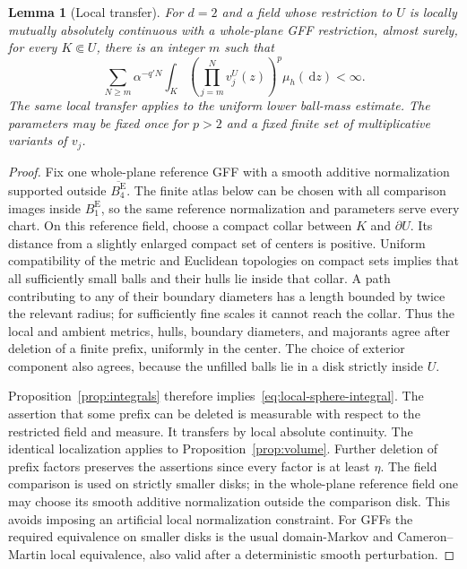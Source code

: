\documentclass[11pt,reqno]{amsart}
\theoremstyle{plain}
\newtheorem{lemma}[theorem]{Lemma}
\theoremstyle{definition}
\theoremstyle{remark}
\newcommand{\1}{\mathbf{1}}
\newcommand{\dd}{\,\mathrm d}
\newcommand{\Be}{B^{\mathrm E}}
\begin{document}
\begin{lemma}[Local transfer]\label{lem:local-transfer}
For $d=2$ and a field whose restriction to $U$ is locally mutually absolutely continuous with a whole-plane GFF restriction, almost surely, for every $K\Subset U$, there is an integer $m$ such that
\begin{equation}\label{eq:local-sphere-integral}
\sum_{N\ge m}\alpha^{-q'N}\int_K\left(\prod_{j=m}^Nv_j^U(z)\right)^p\mu_h(\dd z)<\infty.
\end{equation}
The same local transfer applies to the uniform lower ball-mass estimate. The parameters may be fixed once for $p>2$ and a fixed finite set of multiplicative variants of $v_j$.
\end{lemma}
\begin{proof}
Fix one whole-plane reference GFF with a smooth additive normalization supported outside $\overline{\Be_4}$. The finite atlas below can be chosen with all comparison images inside $\Be_1$, so the same reference normalization and parameters serve every chart. On this reference field, choose a compact collar between $K$ and $\partial U$. Its distance from a slightly enlarged compact set of centers is positive. Uniform compatibility of the metric and Euclidean topologies on compact sets implies that all sufficiently small balls and their hulls lie inside that collar. A path contributing to any of their boundary diameters has a length bounded by twice the relevant radius; for sufficiently fine scales it cannot reach the collar. Thus the local and ambient metrics, hulls, boundary diameters, and majorants agree after deletion of a finite prefix, uniformly in the center. The choice of exterior component also agrees, because the unfilled balls lie in a disk strictly inside $U$.

Proposition~\ref{prop:integrals} therefore implies~\eqref{eq:local-sphere-integral}. The assertion that some prefix can be deleted is measurable with respect to the restricted field and measure. It transfers by local absolute continuity. The identical localization applies to Proposition~\ref{prop:volume}. Further deletion of prefix factors preserves the assertions since every factor is at least $\eta$. The field comparison is used on strictly smaller disks; in the whole-plane reference field one may choose its smooth additive normalization outside the comparison disk. This avoids imposing an artificial local normalization constraint. For GFFs the required equivalence on smaller disks is the usual domain-Markov and Cameron--Martin local equivalence, also valid after a deterministic smooth perturbation.
\end{proof}
\end{document}
